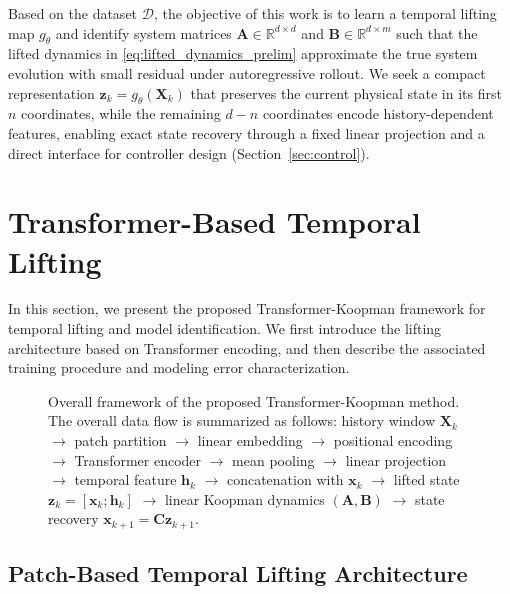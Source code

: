 \documentclass[journal]{IEEEtran}
\newcommand{\vx}{\mathbf{x}}
\newcommand{\vz}{\mathbf{z}}
\newcommand{\vh}{\mathbf{h}}
\newcommand{\mA}{\mathbf{A}}
\newcommand{\mB}{\mathbf{B}}
\newcommand{\mC}{\mathbf{C}}
\newcommand{\mX}{\mathbf{X}}
\begin{document}
Based on the dataset $\mathcal{D}$, the objective of this work is to learn a temporal lifting map $g_\theta$ and identify system matrices $\mA \in \mathbb{R}^{d\times d}$ and $\mB \in \mathbb{R}^{d\times m}$ such that the lifted dynamics in \eqref{eq:lifted_dynamics_prelim} approximate the true system evolution with small residual under autoregressive rollout. We seek a compact representation $\vz_k = g_\theta(\mX_k)$ that preserves the current physical state in its first $n$ coordinates, while the remaining $d-n$ coordinates encode history-dependent features, enabling exact state recovery through a fixed linear projection and a direct interface for controller design (Section~\ref{sec:control}).

\section{Transformer-Based Temporal Lifting}
\label{sec:methodology}

In this section, we present the proposed Transformer-Koopman framework for temporal lifting and model identification. We first introduce the lifting architecture based on Transformer encoding, and then describe the associated training procedure and modeling error characterization.

\begin{figure}[!t]
    \centering
    \caption{Overall framework of the proposed Transformer-Koopman method. The overall data flow is summarized as follows: history window $\mX_k$ $\rightarrow$ patch partition $\rightarrow$ linear embedding $\rightarrow$ positional encoding $\rightarrow$ Transformer encoder $\rightarrow$ mean pooling $\rightarrow$ linear projection $\rightarrow$ temporal feature $\vh_k$ $\rightarrow$ concatenation with $\vx_k$ $\rightarrow$ lifted state $\vz_k=[\vx_k;\vh_k]$ $\rightarrow$ linear Koopman dynamics $(\mA,\mB)$ $\rightarrow$ state recovery $\vx_{k+1}=\mC\vz_{k+1}$.}
    \label{fig:framework}
\end{figure}

\subsection{Patch-Based Temporal Lifting Architecture}
\label{sec:temporal_lifting}
\end{document}
